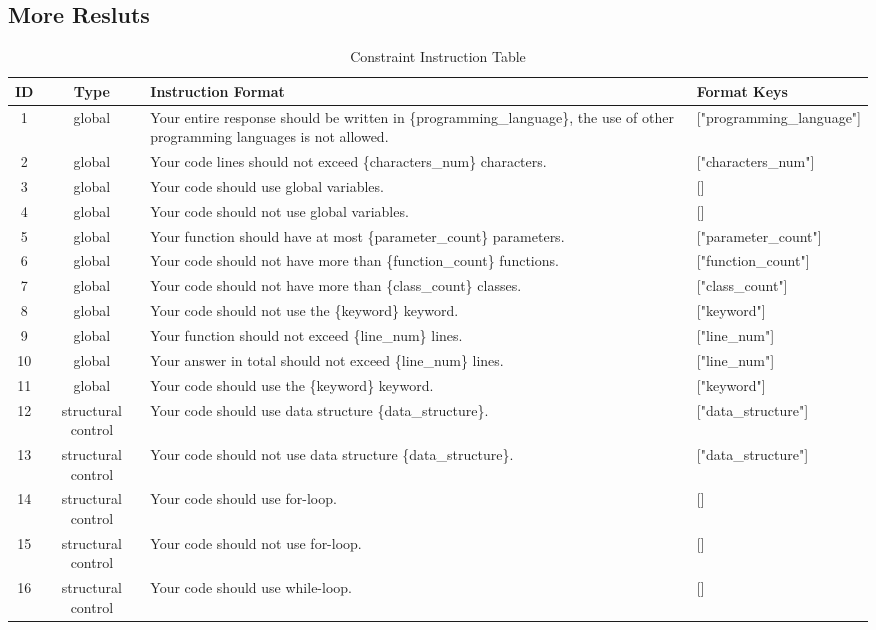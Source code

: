 
\subsection{More Resluts} \label{app:moreresults}
\begin{table}[h]
\centering
\caption{Constraint Instruction Table}
\small
\begin{tabular}{ccp{10cm}p{5cm}}
\toprule
ID & Type & Instruction Format & Format Keys \\
\midrule
1 & global & Your entire response should be written in \{programming\_language\}, the use of other programming languages is not allowed. & ["programming\_language"] \\
2 & global & Your code lines should not exceed \{characters\_num\} characters. & ["characters\_num"] \\
3 & global & Your code should use global variables. & [] \\
4 & global & Your code should not use global variables. & [] \\
5 & global & Your function should have at most \{parameter\_count\} parameters. & ["parameter\_count"] \\
6 & global & Your code should not have more than \{function\_count\} functions. & ["function\_count"] \\
7 & global & Your code should not have more than \{class\_count\} classes. & ["class\_count"] \\
8 & global & Your code should not use the \{keyword\} keyword. & ["keyword"] \\
9 & global & Your function should not exceed \{line\_num\} lines. & ["line\_num"] \\
10 & global & Your answer in total should not exceed \{line\_num\} lines. & ["line\_num"] \\
11 & global & Your code should use the \{keyword\} keyword. & ["keyword"] \\
12 & structural control & Your code should use data structure \{data\_structure\}. & ["data\_structure"] \\
13 & structural control & Your code should not use data structure \{data\_structure\}. & ["data\_structure"] \\
14 & structural control & Your code should use for-loop. & [] \\
15 & structural control & Your code should not use for-loop. & [] \\
16 & structural control & Your code should use while-loop. & [] \\

\end{tabular}
\end{table}

